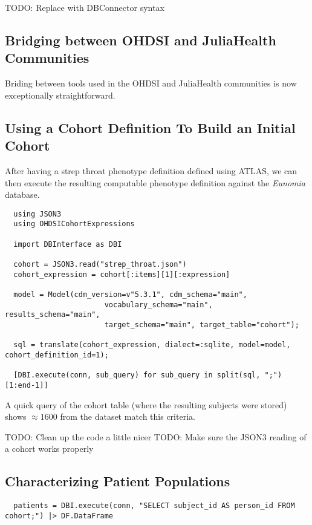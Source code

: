 \documentclass{juliacon}
\begin{document}
TODO: Replace with DBConnector syntax

\subsection{Bridging between OHDSI and JuliaHealth Communities}

Briding between tools used in the OHDSI and JuliaHealth communities is now exceptionally straightforward.


\subsection{Using a Cohort Definition To Build an Initial Cohort}

After having a strep throat phenotype definition defined using ATLAS, we can then execute the resulting computable phenotype definition against the \textit{Eunomia} database.

\begin{verbatim}
  using JSON3 
  using OHDSICohortExpressions

  import DBInterface as DBI

  cohort = JSON3.read("strep_throat.json")
  cohort_expression = cohort[:items][1][:expression]

  model = Model(cdm_version=v"5.3.1", cdm_schema="main",
                       vocabulary_schema="main", results_schema="main",
                       target_schema="main", target_table="cohort");

  sql = translate(cohort_expression, dialect=:sqlite, model=model, cohort_definition_id=1);

  [DBI.execute(conn, sub_query) for sub_query in split(sql, ";")[1:end-1]]
\end{verbatim}

A quick query of the cohort table (where the resulting subjects were stored) shows $\approx 1600$ from the dataset match this criteria.

TODO: Clean up the code a little nicer
TODO: Make sure the JSON3 reading of a cohort works properly

\subsection{Characterizing Patient Populations}

\begin{verbatim}
  patients = DBI.execute(conn, "SELECT subject_id AS person_id FROM cohort;") |> DF.DataFrame
\end{verbatim}
\end{document}
